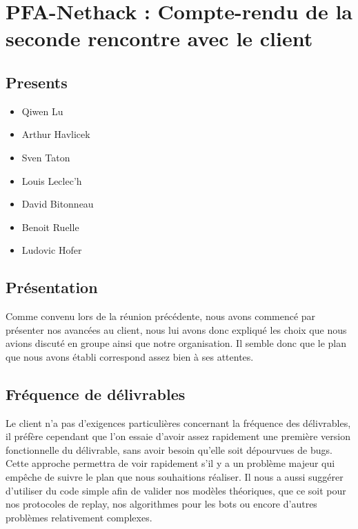 \documentclass{article}
\newcommand {\ST}{Sven Taton}
\newcommand {\QL}{Qiwen Lu}
\newcommand {\LL}{Louis Leclec'h}
\newcommand {\DB}{David Bitonneau}
\newcommand {\AH}{Arthur Havlicek}
\newcommand {\BR}{Benoit Ruelle}
\newcommand {\LH}{Ludovic Hofer}
\begin{document}
\section*{PFA-Nethack : Compte-rendu de la seconde rencontre avec le client}

\subsection*{Presents}
\begin{itemize}
\item \QL
\item \AH
\item \ST
\item \LL
\item \DB
\item \BR
\item \LH
\end{itemize}

\subsection*{Présentation}
Comme convenu lors de la réunion précédente, nous avons commencé par présenter nos avancées au client, nous lui avons donc expliqué les choix que nous avions discuté en groupe ainsi que notre organisation. Il semble donc que le plan que nous avons établi correspond assez bien à ses attentes.

\subsection*{Fréquence de délivrables}
Le client n'a pas d'exigences particulières concernant la fréquence des délivrables, il préfère cependant que l'on essaie d'avoir assez rapidement une première version fonctionnelle du délivrable, sans avoir besoin qu'elle soit dépourvues de bugs. Cette approche permettra de voir rapidement s'il y a un problème majeur qui empêche de suivre le plan que nous souhaitions réaliser. Il nous a aussi suggérer d'utiliser du code simple afin de valider nos modèles théoriques, que ce soit pour nos protocoles de replay, nos algorithmes pour les bots ou encore d'autres problèmes relativement complexes.
\end{document}
